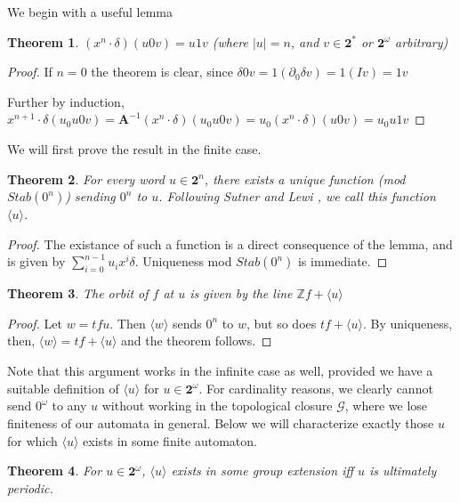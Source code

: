 \documentclass[12pt]{article}
\newcommand{\G}{\mathcal{G}}
\newcommand{\Z}{\mathbb{Z}}
\newcommand{\2}{\textbf{2}}
\newcommand{\Am}{\textbf{A}}
\newcommand{\del}{\partial}
\newtheorem{thm}{Theorem}
\begin{document}
We begin with a useful lemma

\begin{thm}
  $(x^n \cdot \delta) (u0v) = u1v$ 
  (where $|u| = n$, and $v \in \2^*$ or $\2^\omega$ arbitrary)
\end{thm}

\begin{proof}
  If $n=0$ the theorem is clear, since 
  $\delta 0v = 1 (\del_0 \delta v) = 1 (I v) = 1v$

  Further by induction, 
  $x^{n+1} \cdot \delta (u_0u0v) = 
  \Am^{-1} (x^n \cdot \delta) (u_0u0v) =
  u_0 (x^n \cdot \delta) (u0v) =
  u_0u1v$
\end{proof}

We will first prove the result in the finite case.

\begin{thm}
  For every word $u \in \2^n$, there exists a unique function
  (mod $Stab(0^n)$) sending $0^n$ to $u$. Following Sutner and Lewi
  \cite{SutnerLewi12:iter_inver_bin_trans}, we call this function
  $\langle u \rangle$.
\end{thm}

\begin{proof}
  The existance of such a function is a direct consequence of the lemma,
  and is given by $\sum_{i=0}^{n-1} u_i x^i \delta$.
  Uniqueness mod $Stab(0^n)$ is immediate.
\end{proof}

\begin{thm}
  The orbit of $f$ at $u$ is given by the line $\Z f + \langle u \rangle$
\end{thm}

\begin{proof}
  Let $w = tf u$. Then $\langle w \rangle$ sends $0^n$ to $w$, 
  but so does $tf + \langle u \rangle$. By uniqueness, then,
  $\langle w \rangle = tf + \langle u \rangle$ and the theorem follows.
\end{proof}

Note that this argument works in the infinite case as well, provided 
we have a suitable definition of $\langle u \rangle$ for $u \in \2^\omega$.
For cardinality reasons, we clearly cannot send $0^\omega$ to any $u$ without
working in the topological closure $\widehat{\G}$, where we lose finiteness
of our automata in general. Below we will characterize exactly those $u$ 
for which $\langle u \rangle$ exists in some finite automaton.

\begin{thm}
  For $u \in \2^\omega$, $\langle u \rangle$ exists in some group extension
  iff $u$ is ultimately periodic.
\end{thm}
\end{document}
